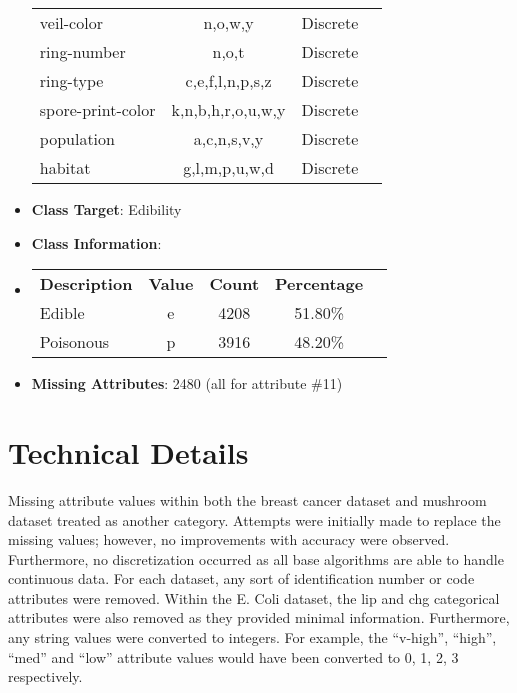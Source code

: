 \documentclass[11pt]{article}
\newcommand{\bb}{\textbf}
\begin{document}
\begin{itemize}[leftmargin=*]
\begin{tabular}{l c c c }
    veil-color               & n,o,w,y                 & Discrete  \\
    ring-number              & n,o,t                   & Discrete  \\
    ring-type                & c,e,f,l,n,p,s,z         & Discrete  \\
    spore-print-color        & k,n,b,h,r,o,u,w,y       & Discrete  \\
    population               & a,c,n,s,v,y             & Discrete  \\
    habitat                  & g,l,m,p,u,w,d           & Discrete
  \end{tabular}
  \item[] \bb{Class Target}: Edibility
  \item[] \bb{Class Information}:
  \item[]
  \begin{tabular}{l c c c c }
    \bb{Description} & \bb{Value} & \bb{Count} & \bb{Percentage} \\
    Edible           & e          & 4208       & 51.80\%        \\
    Poisonous        & p          & 3916       & 48.20\%
  \end{tabular}
  \item[] \bb{Missing Attributes}: 2480 (all for attribute \#11)
\end{itemize}

\section{Technical Details}
Missing attribute values within both the breast cancer dataset and mushroom dataset treated as another category. Attempts were initially made to replace the missing values; however, no improvements with accuracy were observed. Furthermore, no discretization occurred as all base algorithms are able to handle continuous data. For each dataset, any sort of identification number or code attributes were removed. Within the E. Coli dataset, the lip and chg categorical attributes were also removed as they provided minimal information. Furthermore, any string values were converted to integers. For example, the ``v-high'', ``high'', ``med'' and ``low'' attribute values would have been converted to 0, 1, 2, 3 respectively.
\end{document}
